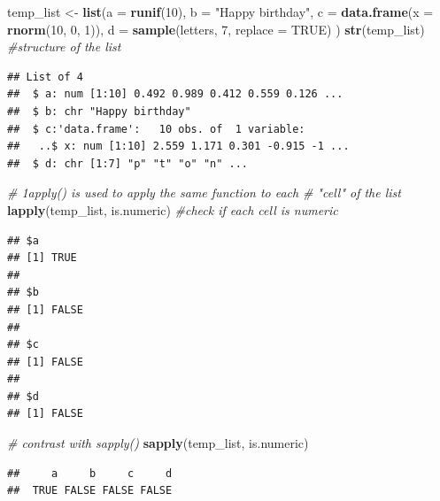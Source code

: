 \documentclass[12pt,]{article}
\newenvironment{Shaded}{\begin{snugshade}}{\end{snugshade}}
\newcommand{\KeywordTok}[1]{\textcolor[rgb]{0.13,0.29,0.53}{\textbf{#1}}}
\newcommand{\DataTypeTok}[1]{\textcolor[rgb]{0.13,0.29,0.53}{#1}}
\newcommand{\DecValTok}[1]{\textcolor[rgb]{0.00,0.00,0.81}{#1}}
\newcommand{\StringTok}[1]{\textcolor[rgb]{0.31,0.60,0.02}{#1}}
\newcommand{\CommentTok}[1]{\textcolor[rgb]{0.56,0.35,0.01}{\textit{#1}}}
\newcommand{\OtherTok}[1]{\textcolor[rgb]{0.56,0.35,0.01}{#1}}
\newcommand{\NormalTok}[1]{#1}
\begin{document}
\begin{Shaded}
\begin{Highlighting}[]
\NormalTok{temp_list <-}\StringTok{ }\KeywordTok{list}\NormalTok{(}\DataTypeTok{a =} \KeywordTok{runif}\NormalTok{(}\DecValTok{10}\NormalTok{),}
                  \DataTypeTok{b =} \StringTok{"Happy birthday"}\NormalTok{,}
                  \DataTypeTok{c =} \KeywordTok{data.frame}\NormalTok{(}\DataTypeTok{x =} \KeywordTok{rnorm}\NormalTok{(}\DecValTok{10}\NormalTok{, }\DecValTok{0}\NormalTok{, }\DecValTok{1}\NormalTok{)),}
                  \DataTypeTok{d =} \KeywordTok{sample}\NormalTok{(letters, }\DecValTok{7}\NormalTok{, }\DataTypeTok{replace =} \OtherTok{TRUE}\NormalTok{)}
\NormalTok{                  )}
\KeywordTok{str}\NormalTok{(temp_list) }\CommentTok{#structure of the list}
\end{Highlighting}
\end{Shaded}

\begin{verbatim}
## List of 4
##  $ a: num [1:10] 0.492 0.989 0.412 0.559 0.126 ...
##  $ b: chr "Happy birthday"
##  $ c:'data.frame':   10 obs. of  1 variable:
##   ..$ x: num [1:10] 2.559 1.171 0.301 -0.915 -1 ...
##  $ d: chr [1:7] "p" "t" "o" "n" ...
\end{verbatim}

\begin{Shaded}
\begin{Highlighting}[]
\CommentTok{# 1apply() is used to apply the same function to each}
\CommentTok{# "cell" of the list}
\KeywordTok{lapply}\NormalTok{(temp_list, is.numeric) }\CommentTok{#check if each cell is numeric}
\end{Highlighting}
\end{Shaded}

\begin{verbatim}
## $a
## [1] TRUE
## 
## $b
## [1] FALSE
## 
## $c
## [1] FALSE
## 
## $d
## [1] FALSE
\end{verbatim}

\begin{Shaded}
\begin{Highlighting}[]
\CommentTok{# contrast with sapply()}
\KeywordTok{sapply}\NormalTok{(temp_list, is.numeric)}
\end{Highlighting}
\end{Shaded}

\begin{verbatim}
##     a     b     c     d 
##  TRUE FALSE FALSE FALSE
\end{verbatim}
\end{document}
